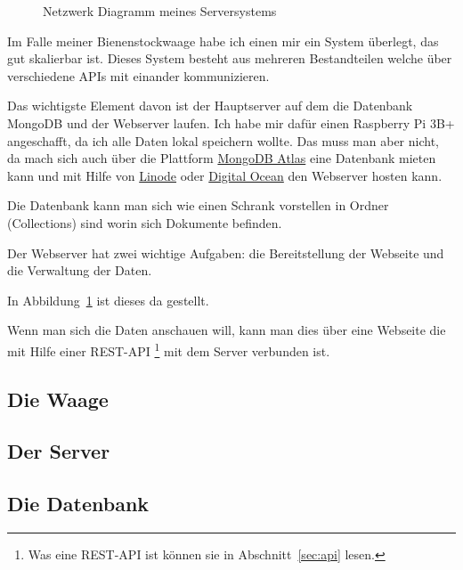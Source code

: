 \documentclass[ngerman,12pt]{scrartcl}
\begin{document}
\begin{figure}[ht]
	\centering
	\caption{Netzwerk Diagramm meines Serversystems\label{abb:networkdiagram}}
\end{figure}

Im Falle meiner Bienenstockwaage habe ich einen mir ein System überlegt, das gut skalierbar ist.
Dieses System besteht aus mehreren Bestandteilen welche über verschiedene APIs mit einander kommunizieren.

Das wichtigste Element davon ist der Hauptserver auf dem die Datenbank MongoDB und der Webserver laufen.
Ich habe mir dafür einen Raspberry Pi 3B+ angeschafft, da ich alle Daten lokal speichern wollte.
Das muss man aber nicht, da mach sich auch über die Plattform \href{https://www.mongodb.com/cloud/atlas}{MongoDB Atlas} eine Datenbank mieten kann und mit Hilfe von \href{https://www.linode.com}{Linode} oder \href{https://www.digitalocean.com/}{Digital Ocean} den Webserver hosten kann.

Die Datenbank kann man sich wie einen Schrank vorstellen in Ordner (Collections) sind worin sich Dokumente befinden.

Der Webserver hat zwei wichtige Aufgaben:
die Bereitstellung der Webseite und die Verwaltung der Daten.


In Abbildung~\ref{abb:networkdiagram} ist dieses da gestellt.


Wenn man sich die Daten anschauen will, kann man dies über eine Webseite die mit Hilfe einer REST-API
\footnote{Was eine REST-API ist können sie in Abschnitt~\ref{sec:api} lesen.}
mit dem Server verbunden ist.

\subsection{Die Waage}

\subsection{Der Server}

\subsection{Die Datenbank}

\printbibliography{}
\end{document}
